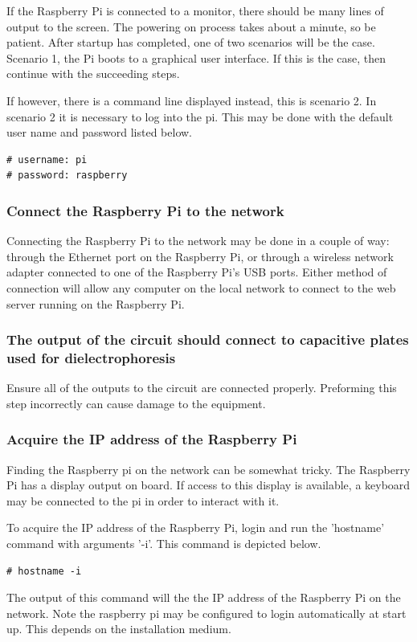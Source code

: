 \documentclass{article}	%
\begin{document}
\begin{multicols}{2}
If the Raspberry Pi is connected to a monitor,
there should be many lines of output to the screen.
The powering on process takes about a minute,
so be patient.
After startup has completed,
one of two scenarios will be the case.
Scenario 1, the Pi boots to a graphical
user interface.
If this is the case,
then continue with the succeeding steps.

If however, there is a command line displayed instead,
this is scenario 2.
In scenario 2 it is necessary to log into the pi.
This may be done with the default user name and password listed below.
\begin{lstlisting}
# username: pi
# password: raspberry
\end{lstlisting}

\subsubsection{Connect the Raspberry Pi to the network}
Connecting the Raspberry Pi to the network may
be done in a couple of way:
through the Ethernet port on the Raspberry Pi, or
through a wireless network adapter connected to
one of the Raspberry Pi's USB ports.
Either method of connection will allow
any computer on the local network to 
connect to the web server running on the Raspberry Pi.

\subsubsection{The output of the circuit should connect to capacitive plates used for dielectrophoresis}
Ensure all of the outputs to the circuit are connected properly.
Preforming this step incorrectly can cause damage to the equipment.

\subsubsection{Acquire the IP address of the Raspberry Pi}
Finding the Raspberry pi on the network can be somewhat tricky.
The Raspberry Pi has a display output on board.
If access to this display is available,
a keyboard may be connected to the pi in order to
interact with it.

To acquire the IP address of the Raspberry Pi,
login and run the 'hostname' command with arguments '-i'.
This command is depicted below.
\begin{lstlisting}
# hostname -i
\end{lstlisting}
The output of this command will the the IP address of
the Raspberry Pi on the network.
Note the raspberry pi may be configured to 
login automatically at start up.
This depends on the installation medium.


\end{multicols}
\end{document}
